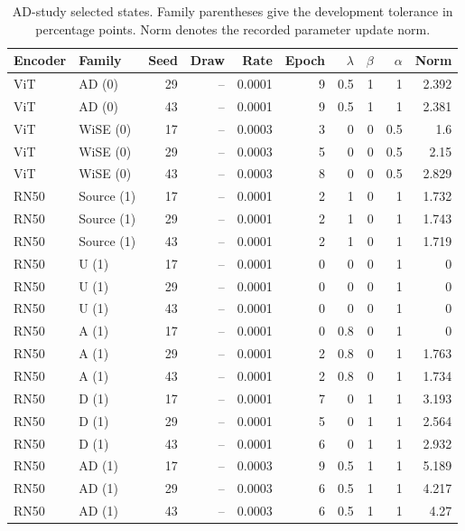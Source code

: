 \begin{table}[t]
\centering
\scriptsize
\setlength{\tabcolsep}{3pt}
\begin{tabular}{llrrrrrrrr}
\toprule
Encoder & Family & Seed & Draw & Rate & Epoch & $\lambda$ & $\beta$ & $\alpha$ & Norm\\
\midrule
ViT & AD (0) & 29 & -- & 0.0001 & 9 & 0.5 & 1 & 1 & 2.392\\
ViT & AD (0) & 43 & -- & 0.0001 & 9 & 0.5 & 1 & 1 & 2.381\\
ViT & WiSE (0) & 17 & -- & 0.0003 & 3 & 0 & 0 & 0.5 & 1.6\\
ViT & WiSE (0) & 29 & -- & 0.0003 & 5 & 0 & 0 & 0.5 & 2.15\\
ViT & WiSE (0) & 43 & -- & 0.0003 & 8 & 0 & 0 & 0.5 & 2.829\\
RN50 & Source (1) & 17 & -- & 0.0001 & 2 & 1 & 0 & 1 & 1.732\\
RN50 & Source (1) & 29 & -- & 0.0001 & 2 & 1 & 0 & 1 & 1.743\\
RN50 & Source (1) & 43 & -- & 0.0001 & 2 & 1 & 0 & 1 & 1.719\\
RN50 & U (1) & 17 & -- & 0.0001 & 0 & 0 & 0 & 1 & 0\\
RN50 & U (1) & 29 & -- & 0.0001 & 0 & 0 & 0 & 1 & 0\\
RN50 & U (1) & 43 & -- & 0.0001 & 0 & 0 & 0 & 1 & 0\\
RN50 & A (1) & 17 & -- & 0.0001 & 0 & 0.8 & 0 & 1 & 0\\
RN50 & A (1) & 29 & -- & 0.0001 & 2 & 0.8 & 0 & 1 & 1.763\\
RN50 & A (1) & 43 & -- & 0.0001 & 2 & 0.8 & 0 & 1 & 1.734\\
RN50 & D (1) & 17 & -- & 0.0001 & 7 & 0 & 1 & 1 & 3.193\\
RN50 & D (1) & 29 & -- & 0.0001 & 5 & 0 & 1 & 1 & 2.564\\
RN50 & D (1) & 43 & -- & 0.0001 & 6 & 0 & 1 & 1 & 2.932\\
RN50 & AD (1) & 17 & -- & 0.0003 & 9 & 0.5 & 1 & 1 & 5.189\\
RN50 & AD (1) & 29 & -- & 0.0003 & 6 & 0.5 & 1 & 1 & 4.217\\
RN50 & AD (1) & 43 & -- & 0.0003 & 6 & 0.5 & 1 & 1 & 4.27\\
\bottomrule
\end{tabular}
\caption{AD-study selected states. Family parentheses give the development tolerance in percentage points. Norm denotes the recorded parameter update norm.}\label{tab:adselected40}
\end{table}


